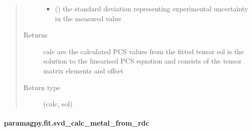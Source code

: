 \documentclass[a4paper,10pt,english]{sphinxmanual}
\begin{document}
\begin{fulllineitems}
\begin{quote}
\begin{description}
\begin{itemize}
\item {} 
 () \textendash{} the standard deviation representing experimental uncertainty
in the measured value

\end{itemize}

\item[{Returns}] \leavevmode
{} \textendash{} calc are the calculated PCS values from the fitted tensor
sol is the solution to the linearised PCS equation and
consists of the tensor matrix elements and offset

\item[{Return type}] \leavevmode
(calc, sol)

\end{description}\end{quote}

\end{fulllineitems}



\paragraph{paramagpy.fit.svd\_calc\_metal\_from\_rdc}
\label{\detokenize{reference/generated/paramagpy.fit.svd_calc_metal_from_rdc:paramagpy-fit-svd-calc-metal-from-rdc}}\label{\detokenize{reference/generated/paramagpy.fit.svd_calc_metal_from_rdc::doc}}
\end{document}
